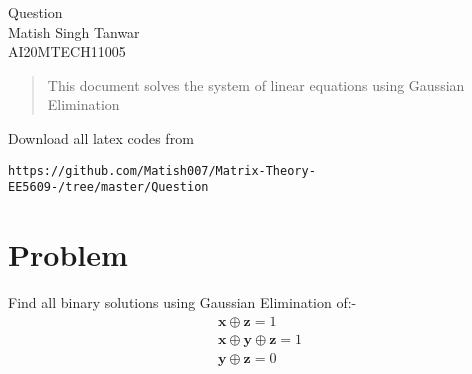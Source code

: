 \documentclass[journal,12pt,twocolumn]{IEEEtran}
\begin{document}
\begin{center}
\huge Question\\

\large Matish Singh Tanwar\\
\large AI20MTECH11005\\
\end{center}
\vspace{1.0cm}
\begin{abstract}
This document solves the system of linear equations using Gaussian Elimination\\
\end{abstract}
\vspace{0.5cm}
Download all latex codes from 
\begin{lstlisting}
https://github.com/Matish007/Matrix-Theory-EE5609-/tree/master/Question
\end{lstlisting}
%
\vspace{0.5mm}
\section{Problem}
Find all binary solutions using Gaussian Elimination of:-
\begin{align}
    \mathbf{x}\oplus\mathbf{z}=1\\
     \mathbf{x}\oplus\mathbf{y}\oplus\mathbf{z}=1\\
      \mathbf{y}\oplus\mathbf{z}=0
\end{align}
\end{document}
